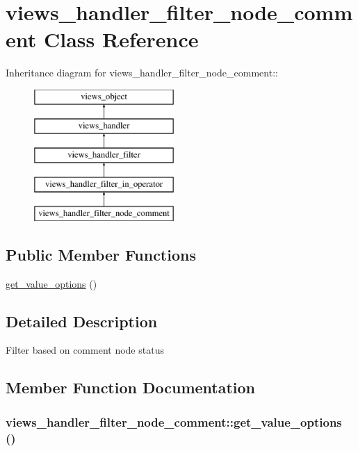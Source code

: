 \hypertarget{classviews__handler__filter__node__comment}{
\section{views\_\-handler\_\-filter\_\-node\_\-comment Class Reference}
\label{classviews__handler__filter__node__comment}
}
Inheritance diagram for views\_\-handler\_\-filter\_\-node\_\-comment::\begin{figure}[H]
\begin{center}
\leavevmode
\includegraphics[height=5cm]{classviews__handler__filter__node__comment}
\end{center}
\end{figure}
\subsection*{Public Member Functions}
\begin{CompactItemize}
\item 
\hyperlink{classviews__handler__filter__node__comment_5f547b83a8bc376d88ba58b75777a12e}{get\_\-value\_\-options} ()
\end{CompactItemize}


\subsection{Detailed Description}
Filter based on comment node status 

\subsection{Member Function Documentation}
\hypertarget{classviews__handler__filter__node__comment_5f547b83a8bc376d88ba58b75777a12e}{
\subsubsection[{get\_\-value\_\-options}]{\setlength{\rightskip}{0pt plus 5cm}views\_\-handler\_\-filter\_\-node\_\-comment::get\_\-value\_\-options ()}}
\label{classviews__handler__filter__node__comment_5f547b83a8bc376d88ba58b75777a12e}


